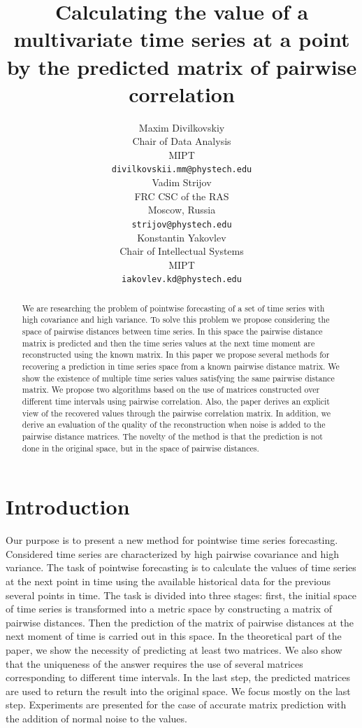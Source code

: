 \documentclass{article}
\title{Calculating the value of a multivariate time series at a point by the predicted matrix of pairwise correlation}
\author{ Maxim Divilkovskiy \\
	Chair of Data Analysis\\
	MIPT\\
	\texttt{divilkovskii.mm@phystech.edu} \\
	\And
	Vadim Strijov \\
	FRC CSC of the RAS\\
	Moscow, Russia\\
    \texttt{strijov@phystech.edu} \\
    \And
    Konstantin Yakovlev \\
    Chair of Intellectual Systems\\
    MIPT\\
    \texttt{iakovlev.kd@phystech.edu} \\
}
\date{}
\begin{document}
\maketitle

\begin{abstract}
	We are researching the problem of pointwise forecasting of a set of time series with high covariance and high variance. To solve this problem we propose considering the space of pairwise distances between time series. In this space the pairwise distance matrix is predicted and then the time series values at the next time moment are reconstructed using the known matrix. In this paper we propose several methods for recovering a prediction in time series space from a known pairwise distance matrix. We show the existence of multiple time series values satisfying the same pairwise distance matrix. We propose two algorithms based on the use of matrices constructed over different time intervals using pairwise correlation. Also, the paper derives an explicit view of the recovered values through the pairwise correlation matrix. In addition, we derive an evaluation of the quality of the reconstruction when noise is added to the pairwise distance matrices. The novelty of the method is that the prediction is not done in the original space, but in the space of pairwise distances.


\end{abstract}



\section{Introduction}
	Our purpose is to present a new method for pointwise time series forecasting. Considered time series are characterized by high pairwise covariance and high variance. The task of pointwise forecasting is to calculate the values of time series at the next point in time using the available historical data for the previous several points in time. The task is divided into three stages: first, the initial space of time series is transformed into a metric space by constructing a matrix of pairwise distances. Then the prediction of the matrix of pairwise distances at the next moment of time is carried out in this space. In the theoretical part of the paper, we show the necessity of predicting at least two matrices. We also show that the uniqueness of the answer requires the use of several matrices corresponding to different time intervals. In the last step, the predicted matrices are used to return the result into the original space. We focus mostly on the last step. Experiments are presented for the case of accurate matrix prediction with the addition of normal noise to the values.
\end{document}
